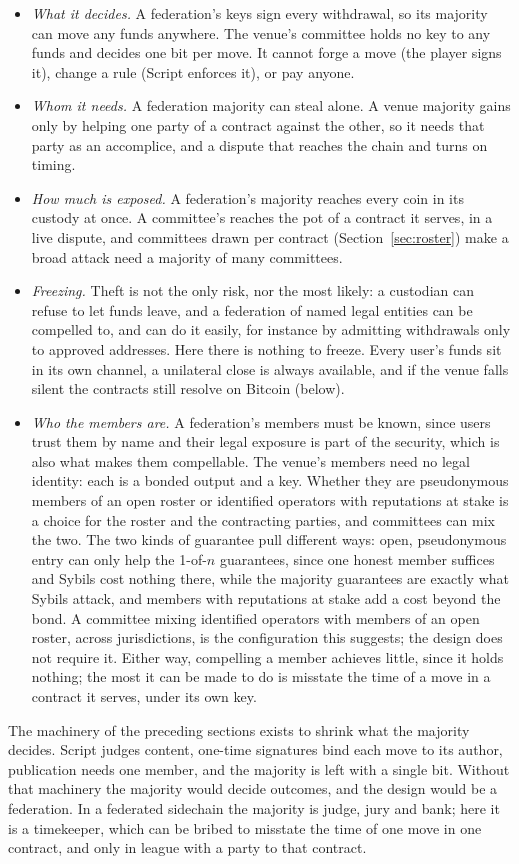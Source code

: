 \documentclass[11pt]{article}
\begin{document}
\begin{itemize}
\item \emph{What it decides.} A federation's keys sign every
  withdrawal, so its majority can move any funds anywhere. The venue's
  committee holds no key to any funds and decides one bit per move. It
  cannot forge a move (the player signs it), change a rule (Script
  enforces it), or pay anyone.
\item \emph{Whom it needs.} A federation majority can steal alone. A
  venue majority gains only by helping one party of a contract against
  the other, so it needs that party as an accomplice, and a dispute
  that reaches the chain and turns on timing.
\item \emph{How much is exposed.} A federation's majority reaches every
  coin in its custody at once. A committee's reaches the pot of a
  contract it serves, in a live dispute, and committees drawn per
  contract (Section~\ref{sec:roster}) make a broad attack need a
  majority of many committees.
\item \emph{Freezing.} Theft is not the only risk, nor the most
  likely: a custodian can refuse to let funds leave, and a federation of
  named legal entities can be compelled to, and can do it easily, for
  instance by admitting withdrawals only to approved addresses. Here
  there is nothing to freeze. Every user's funds sit in its own channel,
  a unilateral close is always available, and if the venue falls
  silent the contracts still resolve on Bitcoin (below).
\item \emph{Who the members are.} A federation's members must be known,
  since users trust them by name and their legal exposure is part of
  the security, which is also what makes them compellable. The venue's
  members need no legal identity: each is a bonded output and a key.
  Whether they are pseudonymous members of an open roster or identified
  operators with reputations at stake is a choice for the roster and the
  contracting parties, and committees can mix the two. The two kinds
  of guarantee pull different ways: open, pseudonymous entry can only
  help the 1-of-$n$ guarantees, since one honest member suffices and
  Sybils cost nothing there, while the majority guarantees are exactly
  what Sybils attack, and members with reputations at stake add a cost
  beyond the bond. A committee mixing identified operators with members
  of an open roster, across jurisdictions, is the configuration this
  suggests; the design does not require it. Either way, compelling a member achieves little, since it
  holds nothing; the most it can be made to do is misstate the time of a
  move in a contract it serves, under its own key.
\end{itemize}
The machinery of the preceding sections exists to shrink what the
majority decides. Script judges content, one-time signatures bind each
move to its author, publication needs one member, and the majority is
left with a single bit. Without that machinery the majority would decide
outcomes, and the design would be a federation. In a federated sidechain
the majority is judge, jury and bank; here it is a timekeeper, which can
be bribed to misstate the time of one move in one contract, and only in
league with a party to that contract.
\end{document}
